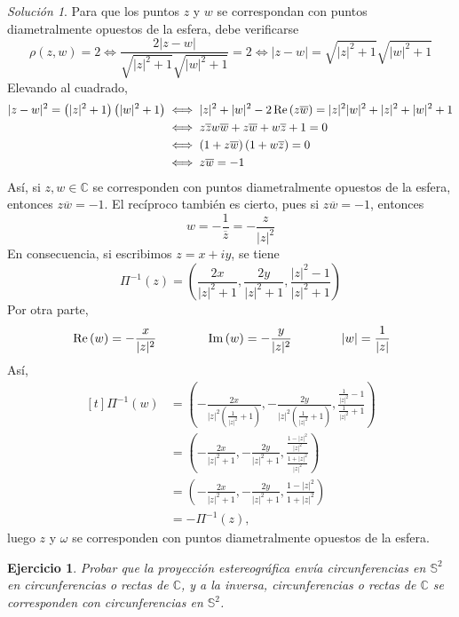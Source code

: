 \documentclass[11pt]{report}
\newcommand{\C}{\mathbb C}
\renewcommand{\S}{\mathbb S}
\newcommand{\pars}[1]{\left( #1 \right)} %
\renewcommand{\Re}[1]{\,\textup{Re}\pars{#1}}
\renewcommand{\Im}[1]{\,\textup{Im}\pars{#1}}
\newtheorem{exercise}{Ejercicio}
\theoremstyle{remark}
\newtheorem*{resolution}{Solución}
\begin{document}
\begin{resolution}
    Para que los puntos $z$ y $w$ se correspondan con puntos diametralmente opuestos de la esfera, debe verificarse
    \[
        \rho(z,w)=2 \iff \frac{2|z-w|}{\sqrt{|z|^2+1}\sqrt{|w|^2+1}} = 2
        \iff |z-w| = \sqrt{|z|^2+1}\sqrt{|w|^2+1}
    \]
    Elevando al cuadrado,
    \[
    \begin{aligned}[t]
    |z-w|^2 = \pars{|z|^2+1}\pars{|w|^2+1} &\iff |z|^2+|w|^2-2\Re{z\overline{w}} = |z|^2|w|^2+|z|^2+|w|^2+1 \\
    &\iff z\overline{z}w\overline{w}+z\overline{w}+w\overline{z}+1=0 \\
    &\iff \pars{1+z\overline{w}}\pars{1+w\overline{z}}=0 \\
    &\iff z\overline{w} = -1
    \end{aligned}
    \]
    Así, si $z,w \in \C$ se corresponden con puntos diametralmente opuestos de la esfera, entonces $z\overline{w}=-1$. El recíproco también es cierto, pues si $z\overline{w} = -1$, entonces \[w = -\frac{1}{\overline{z}} = -\frac{z}{|z|^2}\]
    En consecuencia, si escribimos $ z = x+iy$, se tiene
    \[\Pi^{-1}(z) = \pars{\frac{2x}{|z|^2+1},\frac{2y}{|z|^2+1},\frac{|z|^2-1}{|z|^2+1}}\]
    Por otra parte,
    \[\Re{w} = -\frac{x}{|z|^2} \qquad \qquad \Im{w} = -\frac{y}{|z|^2} \qquad \qquad |w| = \frac{1}{|z|}\]
    Así,
    \[\begin{aligned}[t]
        \Pi^{-1}\pars{w} &= \pars{-\frac{2x}{|z|^2\pars{\frac{1}{|z|^2}+1}},-\frac{2y}{|z|^2\pars{\frac{1}{|z|^2}+1}},\frac{\frac{1}{|z|^2}-1}{\frac{1}{|z|^2}+1}} \\
        &= \pars{-\frac{2x}{|z|^2+1},-\frac{2y}{|z|^2+1},\frac{\frac{1-|z|^2}{|z|^2}}{\frac{1+|z|^2}{|z|^2}}} \\
        &= \pars{-\frac{2x}{|z|^2+1},-\frac{2y}{|z|^2+1},\frac{1-|z|^2}{1+|z|^2}} \\
        &= -\Pi^{-1}(z),
    \end{aligned}\]
    luego $z$ y $\omega$ se corresponden con puntos diametralmente opuestos de la esfera.
\end{resolution}

\begin{exercise}
    Probar que la proyección estereográfica envía circunferencias en $\S^2$ en circunferencias o rectas de $\C$, y a la inversa, circunferencias o rectas de $\C$ se corresponden con circunferencias en $\mathbb{S}^2$.
\end{exercise}
\end{document}
